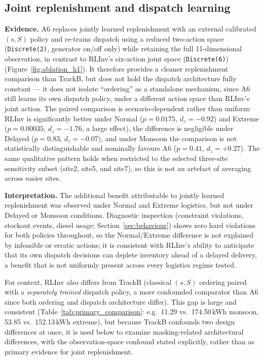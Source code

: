\subsection{Joint replenishment and dispatch learning}
\label{sec:mechanism_h1}

\textbf{Evidence.} A6 replaces jointly learned replenishment with an
external calibrated $(s,S)$ policy and re-trains dispatch using a
reduced two-action space (\texttt{Discrete(2)}, generator on/off only)
while retaining the full 11-dimensional observation, in contrast to
RLInv's six-action joint space (\texttt{Discrete(6)}) (Figure~\ref{fig:ablation_h1}). It therefore
provides a cleaner replenishment comparison than TrackB, but does not
hold the dispatch architecture fully constant --- it does not isolate
``ordering'' as a standalone mechanism, since A6
still learns its own dispatch policy, under a different action space
than RLInv's joint action. The paired comparison is scenario-dependent rather than
uniform: RLInv is significantly better under Normal ($p=0.0175$,
$d_z=-0.92$) and Extreme ($p=0.00035$, $d_z=-1.76$, a large effect),
the difference is negligible under Delayed ($p=0.83$, $d_z=-0.07$),
and under Monsoon the comparison is not statistically distinguishable
and nominally favours A6 ($p=0.41$, $d_z=+0.27$). The same qualitative
pattern holds when restricted to the selected three-site sensitivity
subset (site2, site5, and site7), so
this is not an artefact of averaging across easier sites.

\textbf{Interpretation.} The additional benefit attributable to
jointly learned replenishment was observed under Normal and Extreme
logistics, but not under Delayed or Monsoon conditions. Diagnostic
inspection (constraint violations, stockout events,
diesel usage; Section~\ref{sec:behaviour}) shows zero hard violations
for both policies throughout, so the Normal/Extreme difference is not
explained by infeasible or erratic actions; it is consistent with
RLInv's ability to anticipate that its own dispatch decisions can
deplete inventory ahead of a delayed delivery, a benefit that is not
uniformly present across every logistics regime tested.

For context, RLInv also differs from TrackB (classical $(s,S)$
ordering paired with a \emph{separately trained} dispatch policy, a
more confounded comparator than A6 since both ordering and dispatch
architecture differ). This gap is large and consistent
(Table~\ref{tab:primary_comparison}: e.g.\ 11.29 vs.\ 174.50\,kWh
monsoon, 53.85 vs.\ 152.13\,kWh extreme), but because TrackB confounds
two design differences at once, it is used below to examine
masking-related architectural differences, with the observation-space
confound stated explicitly, rather than as primary evidence for joint
replenishment.

